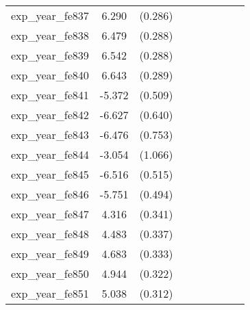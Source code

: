 {\begin{tabular}{l*{4}{cc}}
exp\_year\_fe837&    6.290\sym{***}&  (0.286)&                  &         &                  &         &                  &         \\
exp\_year\_fe838&    6.479\sym{***}&  (0.288)&                  &         &                  &         &                  &         \\
exp\_year\_fe839&    6.542\sym{***}&  (0.288)&                  &         &                  &         &                  &         \\
exp\_year\_fe840&    6.643\sym{***}&  (0.289)&                  &         &                  &         &                  &         \\
exp\_year\_fe841&   -5.372\sym{***}&  (0.509)&                  &         &                  &         &                  &         \\
exp\_year\_fe842&   -6.627\sym{***}&  (0.640)&                  &         &                  &         &                  &         \\
exp\_year\_fe843&   -6.476\sym{***}&  (0.753)&                  &         &                  &         &                  &         \\
exp\_year\_fe844&   -3.054\sym{**} &  (1.066)&                  &         &                  &         &                  &         \\
exp\_year\_fe845&   -6.516\sym{***}&  (0.515)&                  &         &                  &         &                  &         \\
exp\_year\_fe846&   -5.751\sym{***}&  (0.494)&                  &         &                  &         &                  &         \\
exp\_year\_fe847&    4.316\sym{***}&  (0.341)&                  &         &                  &         &                  &         \\
exp\_year\_fe848&    4.483\sym{***}&  (0.337)&                  &         &                  &         &                  &         \\
exp\_year\_fe849&    4.683\sym{***}&  (0.333)&                  &         &                  &         &                  &         \\
exp\_year\_fe850&    4.944\sym{***}&  (0.322)&                  &         &                  &         &                  &         \\
exp\_year\_fe851&    5.038\sym{***}&  (0.312)&                  &         &                  &         &                  &         \\

\end{tabular}}
